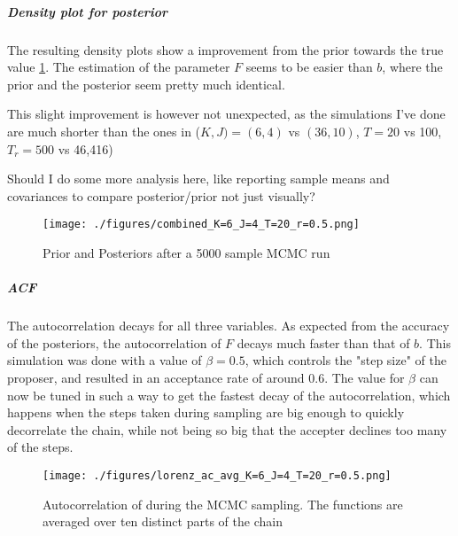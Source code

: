 \documentclass[11pt]{article}
\begin{document}
\subparagraph{Density plot for posterior}
\label{sec:org16c31d5}

The resulting density plots show a improvement from the prior towards the true value \ref{fig:lorenz_densities}.
The estimation of the parameter \(F\) seems to be easier than \(b\), where the prior and the
posterior seem pretty much identical.

This slight improvement is however not unexpected, as the simulations I've done are much shorter than
the ones in \cite{schneider_earth_2017} (\(K, J) = (6,4)\) vs \((36, 10)\), \(T = 20\) vs 100, \(T_r = 500\) vs 46,416)

Should I do some more analysis here, like reporting sample means and covariances to compare
posterior/prior not just visually?

\begin{figure}[htbp]
\centering
\texttt{[image: ./figures/combined\_K=6\_J=4\_T=20\_r=0.5.png]}
\caption{\label{fig:lorenz_densities}
Prior and Posteriors after a 5000 sample MCMC run}
\end{figure}

\subparagraph{ACF}
\label{sec:org0552771}

The autocorrelation decays for all three variables. As expected from the accuracy of the posteriors,
the autocorrelation of \(F\) decays much faster than that of \(b\). This simulation was done with a
value of \(\beta=0.5\), which controls the "step size" of the proposer, and resulted in an acceptance
rate of around \(0.6\). The value for \(\beta\) can now be tuned in such a way to get the fastest decay
of the autocorrelation, which happens when the steps taken during sampling are big enough to
quickly decorrelate the chain, while not being so big that the accepter declines too many of the steps.

\begin{figure}[htbp]
\centering
\texttt{[image: ./figures/lorenz\_ac\_avg\_K=6\_J=4\_T=20\_r=0.5.png]}
\caption{\label{fig:lorenz_acF}
Autocorrelation of during the MCMC sampling. The functions are averaged over ten distinct parts of the chain}
\end{figure}



\end{document}
